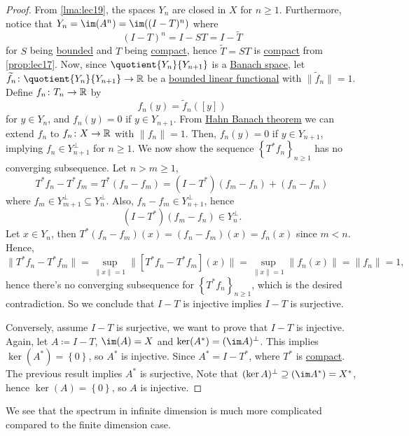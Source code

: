 \begin{proof}
	From \autoref{lma:lec19}, the spaces \(Y_n\) are closed in \(X\) for \(n\geq 1\). Furthermore, notice that \(Y_n = \im(A^n) = \im((I-T)^n)\) where
	\[
		(I-T)^n = I - ST = I - \widetilde{T}
	\]
	for \(S\) being \hyperref[def:bounded-map]{bounded} and \(T\) being \hyperref[def:compact-op]{compact}, hence \(\widetilde{T} = ST\)  is \hyperref[def:compact-op]{compact} from \autoref{prop:lec17}. Now, since \(\quotient{Y_n}{Y_{n+1}} \) is a \hyperref[def:Banach-space]{Banach space}, let \(\widetilde{f} _n \colon \quotient{Y_n}{Y_{n+1}} \to  \mathbb{\MakeUppercase{r}} \) be a \hyperref[def:bounded-linear-functional]{bounded linear functional} with \(\lVert \widetilde{f} _n \rVert=1 \). Define \(f_{n} \colon T_n \to  \mathbb{\MakeUppercase{r}} \) by
	\[
		f_n (y) = \widetilde{f} _n([y])
	\]
	for \(y\in Y_n\), and \(f_n(y) = 0\)  if \(y\in Y_{n+1}\). From \hyperref[thm:Hahn-Banach]{Hahn Banach theorem} we can extend \(f_{n} \) to \(f_{n} \colon X\to \mathbb{\MakeUppercase{r}} \) with \(\lVert f_{n}  \rVert = 1\). Then, \(f_{n} (y) = 0\) if \(y\in Y_{n+1}\), implying \(f_{n} \in Y^{\perp} _{n+1}\) for \(n\geq 1\). We now show the sequence \(\left\{ T^{\ast} f_{n}  \right\} _{n\geq 1}\) has no converging subsequence. Let \(n > m \geq 1\),
	\[
		T^{\ast} f_{n} - T^{\ast} f_m= T^{\ast} (f_{n} - f_{m}) = (I-T^{\ast} )(f_m-f_{n})+ (f_{n} -f_{m})
	\]
	where \(f_m\in Y^{\perp} _{m+1} \subseteq Y^{\perp} _n\). Also, \(f_n - f_m\in Y^{\perp} _{n+1}\), hence
	\[
		(I-T^{\ast} )(f_m - f_n)\in Y^{\perp} _n.
	\]
	Let \(x\in Y_n\), then \(T^{\ast} (f_{n} - f_m)(x) = (f_n - f_m)(x)=f_n(x)\) since \(m < n\). Hence,
	\[
		\lVert T^{\ast} f_n - T^{\ast} f_m \rVert
		= \sup _{\lVert x \rVert = 1} \lVert [T^{\ast} f_n - T^{\ast} f_m] (x)\rVert
		= \sup _{\lVert x \rVert = 1} \lVert f_n(x) \rVert
		= \lVert f_n \rVert
		= 1,
	\]
	hence there's no converging subsequence for \(\left\{ T^{\ast} f_n \right\}_{n\geq 1} \), which is the desired contradiction. So we conclude that \(I-T\) is injective implies \(I-T\) is surjective.

	Conversely, assume \(I-T\) is surjective, we want to prove that \(I-T\) is injective. Again, let \(A\coloneqq I-T\), \(\im(A) = X\) and \(\ker(A^{\ast} )= (\im A)^{\perp} \). This implies \(\ker(A^{\ast} ) = \left\{ 0\right\} \), so \(A^{\ast} \) is injective. Since \(A^{\ast} = I-T^{\ast} \), where \(T^{\ast} \) is \hyperref[def:compact-op]{compact}. The previous result implies \(A^{\ast} \) is surjective, Note that \((\ker A)^{\perp} \supseteq (\im A^{\ast} )= X^{\ast}\), hence \(\ker(A) = \left\{ 0 \right\} \), so \(A\) is injective.
\end{proof}

We see that the spectrum in infinite dimension is much more complicated compared to the finite dimension case.